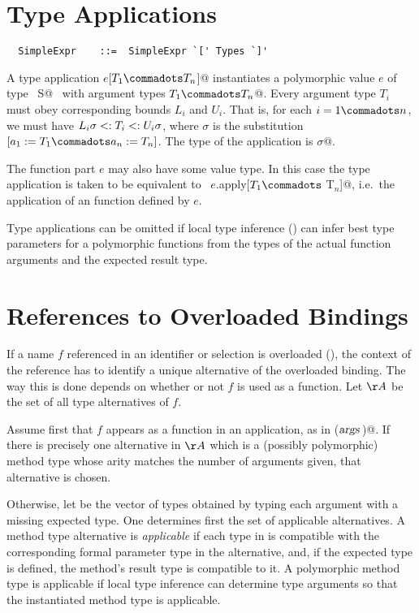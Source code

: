 \documentclass[a4paper,12pt,twoside,titlepage]{book}
\newcommand{\args}{\mbox{\sl args}}
\begin{document}
\section{Type Applications}
\label{sec:type-app}
\syntax\begin{lstlisting}
  SimpleExpr    ::=  SimpleExpr `[' Types `]'
\end{lstlisting}

A type application \lstinline@$e$[$T_1 \commadots T_n$]@ instantiates a
polymorphic value $e$ of type
~\lstinline@[$a_1$ >: $L_1$ <: $U_1 \commadots a_n$ >: $L_n$ <: $U_n$]S@~ with
argument types \lstinline@$T_1 \commadots T_n$@.  Every argument type
$T_i$ must obey corresponding bounds $L_i$ and
$U_i$.  That is, for each $i = 1 \commadots n$, we must
have $L_i \sigma <: T_i <: U_i \sigma$, where $\sigma$ is the
substitution $[a_1 := T_1 \commadots a_n := T_n]$.  The type
of the application is \lstinline@S$\sigma$@.  

The function part $e$ may also have some value type. In this case
the type application is taken to be equivalent to
~\lstinline@$e$.apply[$T_1 \commadots$ T$_n$]@, i.e.\ the
application of an  function defined by $e$.

Type applications can be omitted if local type inference
() can infer best type parameters for a
polymorphic functions from the types of the actual function arguments
and the expected result type.

\section{References to Overloaded Bindings}
\label{sec:overloaded-refs}

If a name $f$ referenced in an identifier or selection is
overloaded (), the context of the reference
has to identify a unique alternative of the overloaded binding. The
way this is done depends on whether or not $f$ is used as a
function.  Let $\AA$ be the set of all type alternatives of
$f$.

Assume first that $f$ appears as a function in an application, as
in \lstinline@f($\args\,$)@.  If there is precisely one alternative in
$\AA$ which is a (possibly polymorphic) method type whose arity
matches the number of arguments given, that alternative is chosen.

Otherwise, let  be the vector of types obtained by
typing each argument with a missing expected type. One determines
first the set of applicable alternatives. A method type alternative is
{\em applicable} if each type in  is compatible with
the corresponding formal parameter type in the alternative, and, if 
the expected type is defined, the method's result type is compatible to
it.  A polymorphic method type is applicable if local type inference
can determine type arguments so that the instantiated method type is
applicable.
\end{document}
